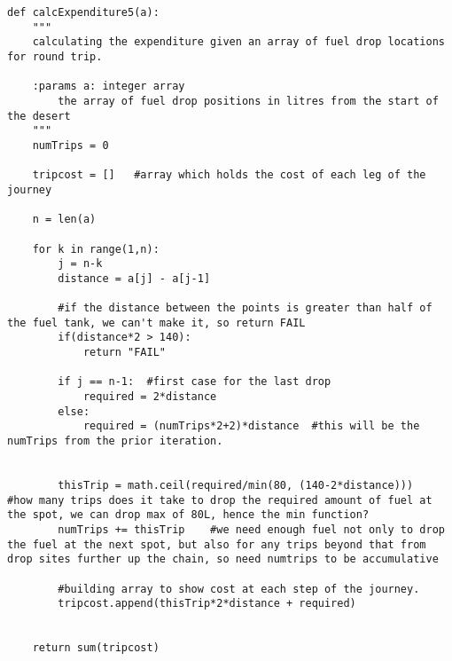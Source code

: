 \documentclass{homework}
\begin{document}
\begin{lstlisting}
def calcExpenditure5(a):
    """
    calculating the expenditure given an array of fuel drop locations for round trip.

    :params a: integer array
        the array of fuel drop positions in litres from the start of the desert
    """
    numTrips = 0

    tripcost = []   #array which holds the cost of each leg of the journey

    n = len(a)  

    for k in range(1,n):   
        j = n-k 
        distance = a[j] - a[j-1]

        #if the distance between the points is greater than half of the fuel tank, we can't make it, so return FAIL
        if(distance*2 > 140):
            return "FAIL"

        if j == n-1:  #first case for the last drop
            required = 2*distance
        else:
            required = (numTrips*2+2)*distance  #this will be the numTrips from the prior iteration.

        
        thisTrip = math.ceil(required/min(80, (140-2*distance)))    #how many trips does it take to drop the required amount of fuel at the spot, we can drop max of 80L, hence the min function?
        numTrips += thisTrip    #we need enough fuel not only to drop the fuel at the next spot, but also for any trips beyond that from drop sites further up the chain, so need numtrips to be accumulative
        
        #building array to show cost at each step of the journey.
        tripcost.append(thisTrip*2*distance + required)


    return sum(tripcost)

\end{lstlisting}
\newline
\end{document}
